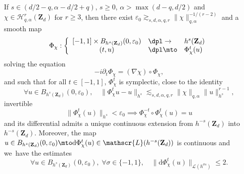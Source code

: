\begin{proposition}
\label{prop_ham_flow} If $s\in (d/2-q, \alpha-d/2+q)$, $s\geq 0$, $\alpha >\max(d-q,d/2)$ and $\chi \in \mathscr{H}_{q,\alpha}^r(\mathbf{Z}_d)$ for $r\geq 3$, then there exist $ \varepsilon_0 \gtrsim_{s,d,\alpha,q,r} \|\chi \|_{q,\alpha}^{-1/(r-2)}$ and a smooth map
\[
\Phi_\chi: \left\{ \begin{array}{cll} [-1,1] \times B_{h^s(\mathbf{Z}_d)}(0,\varepsilon_0) &\dpl\to& h^s(\mathbf{Z}_d) \\ (t,u) &\dpl\mto& \Phi_\chi^t(u) \end{array} \right.
\]
solving the equation
\[
-i\partial_t \Phi_\chi = (\nabla \chi)\circ \Phi_\chi,
\]
and such that for all $t\in [-1,1]$, $\Phi_\chi^t$ is symplectic, close to the identity
\begin{equation}
\label{eq_dindon}
\forall u \in B_{h^s(\mathbf{Z}_d)}(0,\varepsilon_0), \quad \| \Phi_\chi^t u - u \|_{h^s} \lesssim_{s,d,\alpha,q,r} \|\chi \|_{q,\alpha} \| u \|_{h^s}^{r-1},
\end{equation}
invertible
\begin{equation}
\label{eq_invertibility}
\|\Phi_\chi^{t} (u) \|_{h^s} < \varepsilon_0 \implies \Phi_\chi^{-t}\circ \Phi_\chi^{t} (u) = u
\end{equation}
and its differential admits a unique continuous extension from $h^{-s}(\mathbf{Z}_d)$ into $h^{-s}(\mathbf{Z}_d)$. Moreover, the map $u\in B_{h^s(\mathbf{Z}_d)}(0,\varepsilon_0) \mto \mathrm{d} \Phi_\chi^t(u) \in \mathscr{L}(h^{-s}(\mathbf{Z}_d))$ is continuous and we~have the estimates
\begin{equation}
\label{eq_petanque}
\forall u \in B_{h^s(\mathbf{Z}_d)}(0,\varepsilon_0),\;\forall \sigma\in \{-1,1\},\quad \| \mathrm{d} \Phi_\chi^t (u)\|_{\mathscr{L}(h^{\sigma s})}\leq 2.
\end{equation}
\end{proposition}
